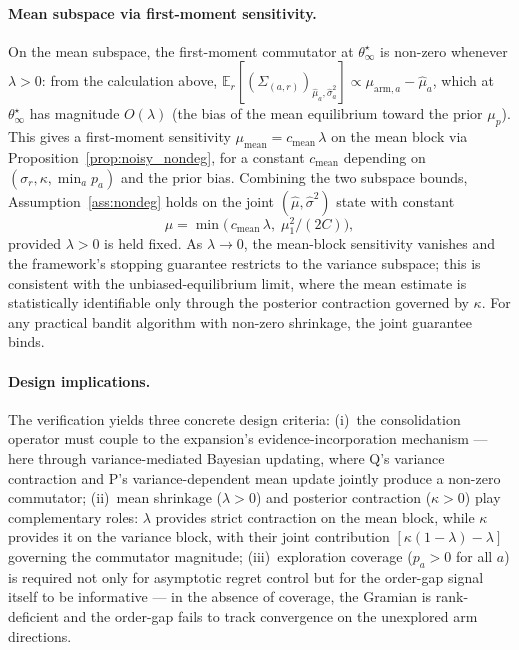 \documentclass[12pt,a4paper]{article}
\begin{document}
\paragraph{Mean subspace via first-moment sensitivity.}
On the mean subspace, the first-moment commutator at $\theta^\star_\infty$
is non-zero whenever $\lambda > 0$: from the calculation above,
$\mathbb{E}_r[(\Sigma_{(a,r)})_{\hat\mu_a, \hat\sigma_a^2}] \propto
\mu_{\mathrm{arm},a} - \hat\mu_a$, which at $\theta^\star_\infty$ has
magnitude $O(\lambda)$ (the bias of the mean equilibrium toward the prior
$\mu_p$). This gives a first-moment sensitivity $\mu_{\mathrm{mean}} =
c_{\mathrm{mean}}\,\lambda$ on the mean block via
Proposition~\ref{prop:noisy_nondeg}, for a constant $c_{\mathrm{mean}}$
depending on $(\sigma_r, \kappa, \min_a p_a)$ and the prior bias. Combining
the two subspace bounds, Assumption~\ref{ass:nondeg} holds on the joint
$(\hat\mu, \hat\sigma^2)$ state with constant
\[
  \mu = \min\bigl(\,c_{\mathrm{mean}}\,\lambda,\; \mu_1^2/(2C)\bigr),
\]
provided $\lambda > 0$ is held fixed. As $\lambda \to 0$, the mean-block
sensitivity vanishes and the framework's stopping guarantee restricts to the
variance subspace; this is consistent with the unbiased-equilibrium limit,
where the mean estimate is statistically identifiable only through the
posterior contraction governed by $\kappa$. For any practical bandit
algorithm with non-zero shrinkage, the joint guarantee binds.

\paragraph{Design implications.}
The verification yields three concrete design criteria:
(i)~the consolidation operator must couple to the expansion's
evidence-incorporation mechanism — here through variance-mediated Bayesian
updating, where Q's variance contraction and P's variance-dependent mean
update jointly produce a non-zero commutator;
(ii)~mean shrinkage ($\lambda > 0$) and posterior contraction ($\kappa > 0$)
play complementary roles: $\lambda$ provides strict contraction on the mean
block, while $\kappa$ provides it on the variance block, with their joint
contribution $[\kappa(1-\lambda) - \lambda]$ governing the commutator
magnitude;
(iii)~exploration coverage ($p_a > 0$ for all $a$) is required not only for
asymptotic regret control but for the order-gap signal itself to be
informative — in the absence of coverage, the Gramian is rank-deficient and
the order-gap fails to track convergence on the unexplored arm directions.
\end{document}
